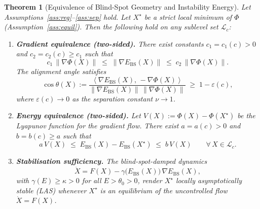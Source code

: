 \documentclass[11pt]{article}
\newtheorem{theorem}{Theorem}[section]
\theoremstyle{definition}
\newcommand{\Xst}{X^{\star}}
\newcommand{\grad}{\nabla}
\newcommand{\Ebs}{E_{\mathrm{BS}}}
\newcommand{\norm}[1]{\left\|#1\right\|}
\newcommand{\inner}[2]{\left\langle #1,\, #2\right\rangle}
\newcommand{\costheta}{\cos\theta}
\begin{document}
\begin{theorem}[Equivalence of Blind-Spot Geometry and Instability Energy]
\label{thm:equiv}
Let Assumptions~\ref{ass:reg}--\ref{ass:sep} hold. Let $\Xst$ be a strict
local minimum of $\Phi$ (Assumption~\ref{ass:equil}).
Then the following hold on any sublevel set $\mathcal{L}_c$:

\begin{enumerate}
  \item[\textup{(C1)}] \textbf{Gradient equivalence (two-sided).}
    There exist constants $c_1 = c_1(c) > 0$ and $c_2 = c_2(c) \ge c_1$ such that
    \[
      c_1\,\norm{\grad\Phi(X)} \;\le\; \norm{\grad\Ebs(X)} \;\le\; c_2\,\norm{\grad\Phi(X)}.
    \]
    The alignment angle satisfies
    \[
      \costheta(X)
      := \frac{\inner{\grad\Ebs(X)}{-\grad\Phi(X)}}%
              {\norm{\grad\Ebs(X)}\,\norm{\grad\Phi(X)}}
      \;\ge\; 1 - \varepsilon(c),
    \]
    where $\varepsilon(c) \to 0$ as the separation constant $\nu \to 1$.

  \item[\textup{(C2)}] \textbf{Energy equivalence (two-sided).}
    Let $V(X) := \Phi(X) - \Phi(\Xst)$ be the Lyapunov function for the
    gradient flow. There exist $a = a(c) > 0$ and $b = b(c) \ge a$ such that
    \[
      a\,V(X) \;\le\; \Ebs(X) - \Ebs(\Xst) \;\le\; b\,V(X)
      \qquad \forall\, X \in \mathcal{L}_c.
    \]

  \item[\textup{(C3)}] \textbf{Stabilisation sufficiency.}
    The blind-spot-damped dynamics
    \begin{equation}
      \label{eq:bsdamped}
      \dot{X} = F(X) - \gamma\bigl(\Ebs(X)\bigr)\,\grad\Ebs(X),
    \end{equation}
    with $\gamma(E) \ge \kappa > 0$ for all $E > \theta_0 > 0$,
    render $\Xst$ \emph{locally asymptotically stable} (LAS) whenever
    $\Xst$ is an equilibrium of the uncontrolled flow $\dot{X}=F(X)$.
\end{enumerate}
\end{theorem}
\end{document}
